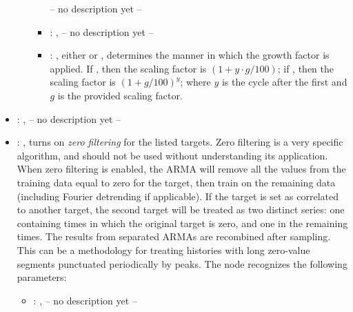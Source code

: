 \begin{itemize}
\begin{itemize}
\begin{itemize}
                -- no description yet --
              \item {}: , 
                -- no description yet --
              \item {}: , 
                either  or                     , determines
                the manner in which the growth factor is applied.                     If
                , then the scaling factor is $(1+y\cdot g/100)$;
                if , then the scaling factor is $(1+g/100)^y$;
                where $y$ is the cycle after the first and $g$ is the provided scaling factor.
          \end{itemize}
      \end{itemize}

    \item {}: , 
      -- no description yet --

    \item {}: , 
      turns on \emph{zero filtering}                                                  for the listed
      targets. Zero filtering is a very specific algorithm, and should not be used without
      understanding its application.  When zero filtering is enabled, the ARMA will remove all the
      values from                                                  the training data equal to zero
      for the target, then train on the remaining data (including Fourier detrending
      if applicable). If the target is set as correlated to another target, the second target will
      be treated as                                                  two distinct series: one
      containing times in which the original target is zero, and one in the remaining
      times. The results from separated ARMAs are recombined after sampling. This can be a
      methodology for                                                  treating histories with long
      zero-value segments punctuated periodically by peaks.
      The  node recognizes the following parameters:
        \begin{itemize}
          \item {}: , 
            -- no description yet --
      \end{itemize}


\end{itemize}
